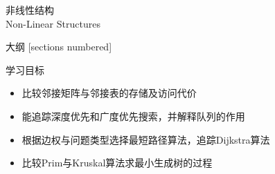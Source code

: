 \begin{standout}[第三章]
    非线性结构\\
    Non-Linear Structures
\end{standout}

\begin{frame}{大纲}
    [sections numbered]
    \tableofcontents
\end{frame}

\begin{frame}{学习目标}
    \begin{itemize}
        \item 比较邻接矩阵与邻接表的存储及访问代价
        \item 能追踪深度优先和广度优先搜索，并解释队列的作用
        \item 根据边权与问题类型选择最短路径算法，追踪Dijkstra算法
        \item 比较Prim与Kruskal算法求最小生成树的过程
    \end{itemize}
\end{frame}

